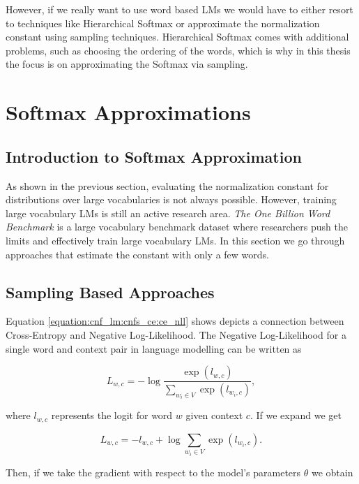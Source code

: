 However, if we really want to use word based LMs we would have to either resort to techniques like Hierarchical Softmax \citep{morin2005hierarchical} or approximate the normalization constant using sampling techniques. Hierarchical Softmax comes with additional problems, such as choosing the ordering of the words, which is why in this thesis the focus is on approximating the Softmax via sampling.

\section{Softmax Approximations}
\label{section:cnf_lm:softmax_approximations}
\subsection{Introduction to Softmax Approximation}

As shown in the previous section, evaluating the normalization constant for distributions over large vocabularies is not always possible. However, training large vocabulary LMs is still an active research area. \emph{The One Billion Word Benchmark} \citep{chelba2013one} is a large vocabulary benchmark dataset where researchers push the limits and effectively train large vocabulary LMs. In this section we go through approaches that estimate the constant with only a few words.

\subsection{Sampling Based Approaches}

Equation \ref{equation:cnf_lm:cnfs_ce:ce_nll} shows depicts a connection between Cross-Entropy and Negative Log-Likelihood. The Negative Log-Likelihood for a single word and context pair in language modelling can be written as

\begin{displaymath}
    L_{w, c} = - \log \frac{\exp(l_{w,c})}{\sum_{w_i \in V} \exp(l_{w_i,c})},
\end{displaymath}

where $ l_{w,c} $ represents the logit for word $ w $ given context $ c $. If we expand we get

\begin{displaymath}
    L_{w, c} = - l_{w, c} + \log \sum_{w_i \in V} \exp(l_{w_i,c}).
\end{displaymath}

Then, if we take the gradient with respect to the model's parameters $ \theta $ we obtain

